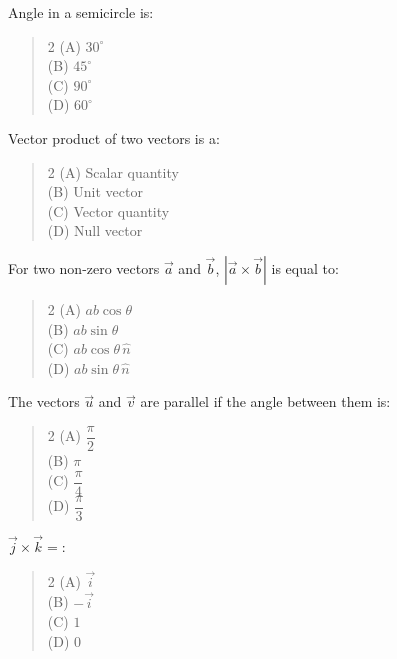 \documentclass[11pt,a4paper]{article}
\begin{document}
\begin{mcqlist}
\item Angle in a semicircle is:
\begin{quote}\begin{multicols}{2}
\noindent (A) $30^\circ$ \\
(B) $45^\circ$ \\
(C) $90^\circ$ \\
(D) $60^\circ$
\end{multicols}\end{quote}

\item Vector product of two vectors is a:
\begin{quote}\begin{multicols}{2}
\noindent (A) Scalar quantity \\
(B) Unit vector \\
(C) Vector quantity \\
(D) Null vector
\end{multicols}\end{quote}

\item For two non-zero vectors $\vec{a}$ and $\vec{b}$, $|\vec{a}\times\vec{b}|$ is equal to:
\begin{quote}\begin{multicols}{2}
\noindent (A) $ab\cos\theta$ \\
(B) $ab\sin\theta$ \\
(C) $ab\cos\theta\,\hat{n}$ \\
(D) $ab\sin\theta\,\hat{n}$
\end{multicols}\end{quote}

\item The vectors $\vec{u}$ and $\vec{v}$ are parallel if the angle between them is:
\begin{quote}\begin{multicols}{2}
\noindent (A) $\dfrac{\pi}{2}$ \\
(B) $\pi$ \\
(C) $\dfrac{\pi}{4}$ \\
(D) $\dfrac{\pi}{3}$
\end{multicols}\end{quote}

\item $\vec{j}\times\vec{k}=$:
\begin{quote}\begin{multicols}{2}
\noindent (A) $\vec{i}$ \\
(B) $-\vec{i}$ \\
(C) $1$ \\
(D) $0$
\end{multicols}\end{quote}


\end{mcqlist}
\end{document}
